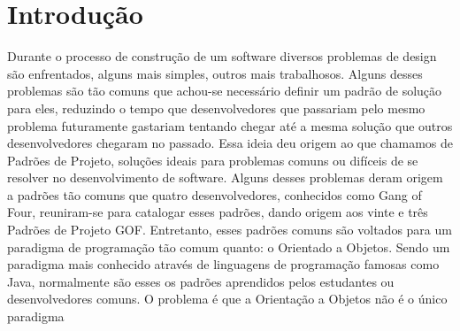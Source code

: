 


\chapter{Introdução}


Durante o processo de construção de um software diversos problemas de design são 
enfrentados, alguns mais simples, outros mais trabalhosos. Alguns desses problemas 
são tão comuns que achou-se necessário definir um padrão de solução para eles, 
reduzindo o tempo que desenvolvedores que passariam pelo mesmo problema futuramente 
gastariam tentando chegar até a mesma solução que outros desenvolvedores chegaram 
no passado. Essa ideia deu origem ao que chamamos de Padrões de Projeto, soluções 
ideais para problemas comuns ou difíceis de se resolver no desenvolvimento de software.
Alguns desses problemas deram origem a padrões tão comuns que quatro desenvolvedores, 
conhecidos como Gang of Four, reuniram-se para catalogar esses padrões, dando 
origem aos vinte e três Padrões de Projeto GOF.
Entretanto, esses padrões comuns são voltados para um paradigma de programação 
tão comum quanto: o Orientado a Objetos. Sendo um paradigma mais conhecido através 
de linguagens de programação famosas como Java, normalmente são esses os padrões 
aprendidos pelos estudantes ou desenvolvedores comuns. O problema é que a 
Orientação a Objetos não é o único paradigma 